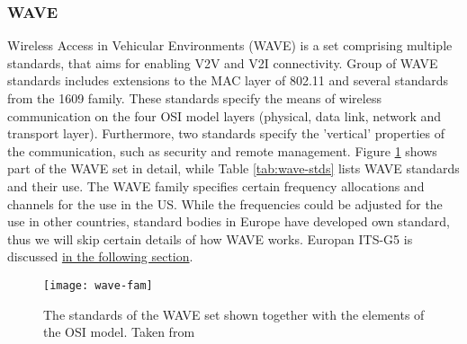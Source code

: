 \subsubsection{WAVE}
% 
\begin{center}
\end{center}\par
% 
Wireless Access in Vehicular Environments (WAVE) is a set comprising multiple standards, that aims for enabling V2V and V2I connectivity. Group of WAVE standards includes extensions to the MAC layer of 802.11 and several standards from the 1609 family. These standards specify the means of wireless communication on the four OSI model layers (physical, data link, network and transport layer). Furthermore, two standards specify the 'vertical' properties of the communication, such as security and remote management. Figure \ref{fig:wave-fam} shows part of the WAVE set in detail, while Table \ref{tab:wave-stds} lists WAVE standards and their use. The WAVE family specifies certain frequency allocations and channels for the use in the US. While the frequencies could be adjusted for the use in other countries, standard bodies in Europe have developed own standard, thus we will skip certain details of how WAVE works. Europan ITS-G5 is discussed \hyperref[sec:ITS-G5]{in the following section}.\par
% 
\begin{figure}
    \centering
    \texttt{[image: wave-fam]}
    \caption{The standards of the WAVE set shown together with the elements of the OSI model. Taken from \cite{VehicularTechnologySociety2014IEEEArchitecture}}
    \label{fig:wave-fam}
\end{figure}

